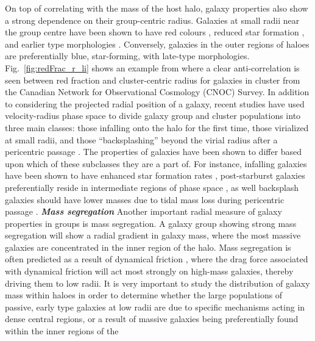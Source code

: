 On top of correlating with the mass of the host halo, galaxy
properties also show a strong dependence on their group-centric
radius.  Galaxies at small radii near the group centre have been shown
to have red colours \citep{blanton2007b, hansen2009, li2009,
  prescott2011}, reduced star formation
\citep{rasmussen2012, wetzel2012, haines2015}, and earlier type
morphologies
\citep{whitmore1993, goto2003, postman2005, fasano2015}.  Conversely, galaxies in the outer regions of
haloes are preferentially blue, star-forming, with late-type
morphologies.  Fig.~\ref{fig:redFrac_r_li} shows an example from
\citet{li2009} where a clear anti-correlation is seen between red
fraction and cluster-centric radius for galaxies in cluster from the
Canadian Network for Observational Cosmology (CNOC) Survey. In
addition to considering the projected radial
position of a galaxy, recent studies have used velocity-radius phase
space to divide galaxy group and cluster populations into three main
classes: those infalling onto the halo for the first time, those
virialized at small radii, and those ``backsplashing'' beyond the
virial radius after a pericentric passage
\citep[e.g.][]{mahajan2011}.  The
properties of galaxies have been shown to differ based upon which of
these subclasses they are a part of.  For instance, infalling galaxies
have been shown to have enhanced star formation rates \citep{noble2016}, post-starburst galaxies preferentially reside in
intermediate regions of phase space \citep{muzzin2014}, as well
backsplash galaxies should have lower masses due to tidal mass loss
during pericentric passage \citep{gill2005}. \vspace{1em} \newline
\noindent \textit{\textbf{Mass segregation}}
\smallskip
\newline
Another important radial measure of galaxy properties in groups is
mass segregation.  A galaxy group showing strong mass segregation will
show a radial gradient in galaxy mass, where the most massive galaxies
are concentrated in the inner region of the halo.  Mass segregation is
often predicted as a result of dynamical friction \citep{chandrasekhar1943}, where the drag force associated with dynamical friction
will act most strongly on high-mass galaxies, thereby driving them to
low radii.  It is very important to study the distribution of galaxy
mass within haloes in order to determine whether the large populations
of passive, early type galaxies at low radii are due to specific
mechanisms acting in dense central regions, or a result of massive
galaxies being preferentially found within the inner regions of the
